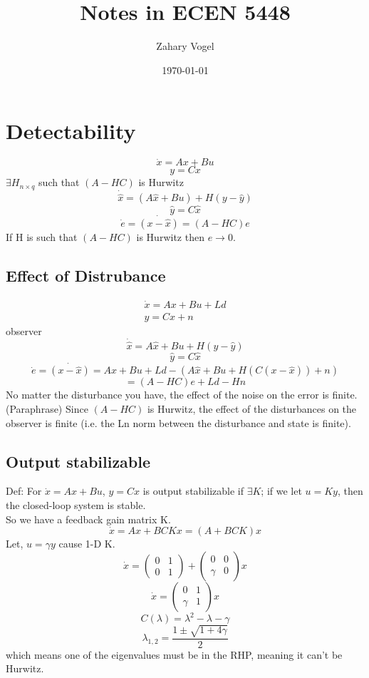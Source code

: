 \documentclass{article}
\author{Zahary Vogel}
\date{\today}
\title{Notes in ECEN 5448}
\begin{document}
\maketitle


\section{Detectability}
\[\dot{x}=Ax+Bu\]
\[y=Cx\]
$\exists H_{n\times q}$ such that $(A-HC)$ is Hurwitz\\
\[\dot{\hat{x}}=(A\hat{x}+Bu)+H(y-\hat{y})\]
\[\hat{y}=C\hat{x}\]
\[\dot{e}=\dot{(x-\hat{x})}=(A-HC)e\]
If H is such that $(A-HC)$ is Hurwitz then $e\to 0$.\\

\subsection{Effect of Distrubance}
\[\begin{array}{c}\dot{x}=Ax+Bu+Ld\\y=Cx+n\end{array}\]
observer
\[\dot{\hat{x}}=A\hat{x}+Bu+H(y-\hat{y})\]
\[\hat{y}=C\hat{x}\]
\[\dot{e}=\dot{(x-\hat{x})}=Ax+Bu+Ld-(A\hat{x}+Bu+H(C(x-\hat{x}))+n)\]
\[=(A-HC)e+Ld-Hn\]
No matter the disturbance you have, the effect of the noise on the error is finite. (Paraphrase) Since $(A-HC)$ is Hurwitz, the effect of the disturbances on the observer is finite (i.e. the Ln norm between the disturbance and state is finite).\\
\subsection{Output stabilizable}
Def: For $\dot{x}=Ax+Bu$, $y=Cx$ is output stabilizable if $\exists K$; if we let $u=Ky$, then the closed-loop system is stable.\\
So we have a feedback gain matrix K.
\[\dot{x}=Ax+BCKx=(A+BCK)x\]
Let, $u=\gamma y$ cause 1-D K.
\[\dot{x}=\begin{pmatrix}0 &1\\0&1\end{pmatrix}+\begin{pmatrix}0&0\\\gamma&0\end{pmatrix}x\]
\[\dot{x}=\begin{pmatrix}0&1\\\gamma&1\end{pmatrix}x\]
\[C(\lambda)=\lambda^2-\lambda-\gamma\]
\[\lambda_{1,2}=\frac{1\pm\sqrt{1+4\gamma}}{2}\]
which means one of the eigenvalues must be in the RHP, meaning it can't be Hurwitz.\\
\end{document}
